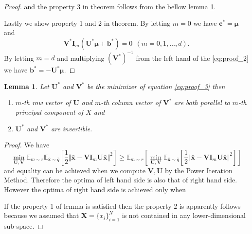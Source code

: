 \documentclass{article}
\newtheorem{lemma}{Lemma}
\begin{document}
\begin{proof}
      and the property 3 in theorem follows from the bellow lemma \ref{lm:pca}. 
      
      Lastly we show property 1 and 2 in theorem. By letting $m=0$ we have $\mathbf{c}^\ast = \mathbf{\mu}$ and 
      \begin{equation}
        \mathbf{V}^\ast \mathbf{I}_m (\mathbf{U^\ast} \mathbf{\mu} + \mathbf{b^\ast}) = 0 \ \ (m=0, 1, \dots, d).
      \end{equation}
      By letting $m=d$ and multiplying $(\mathbf{V}^\ast)^{-1}$ from the left hand of the \ref{eq:proof_2} we have $\mathbf{b}^\ast = - \mathbf{U}^\ast \mathbf{\mu}$.
    \end{proof}

    \begin{lemma}
      \label{lm:pca}
      Let $\mathbf{U}^\ast$ and $\mathbf{V}^\ast$ be the minimizer of equation \ref{eq:proof_3} then 
      \begin{enumerate}
        \item $m$-th row vector of $\mathbf{U}$ and $m$-th column vector of $\mathbf{V}^\ast$ are both parallel to $m$-th principal component of $X$ and
        \item $\mathbf{U}^\ast$ and $\mathbf{V}^\ast$ are invertible.
      \end{enumerate}
    \end{lemma}
    \begin{proof}
      We have
      \begin{equation}
        \min_{\mathbf{U}, \mathbf{V}} \mathbb{E}_{m \sim r} \mathbb{E}_{\bar{\mathbf{x}} \sim \bar{q}} \left[ \frac{1}{2} \Vert \bar{\mathbf{x}} - \mathbf{V} \mathbf{I}_m \mathbf{U} \bar{\mathbf{x}} \Vert^2 \right]  
        \geq \mathbb{E}_{m \sim r} \left[ \min_{\mathbf{U}, \mathbf{V}} \mathbb{E}_{\bar{\mathbf{x}} \sim \bar{q}} \left[ \frac{1}{2} \Vert \bar{\mathbf{x}} - \mathbf{V} \mathbf{I}_m \mathbf{U} \bar{\mathbf{x}} \Vert^2 \right] \right]
        \label{eq:proof_4}
      \end{equation}
      and equality can be achieved when we compute $\mathbf{V}, \mathbf{U}$ by the Power Iteration Method. Therefore the optima of left hand side is also that of right hand side. However the optima of right hand side is achieved only when
      
      If the property 1 of lemma is satisfied then the property 2 is apparently follows because we assumed that $\mathbf{X}=\{x_i\}_{i=1}^N$ is not contained in any lower-dimensional sub-space. 

      
    \end{proof}    
\end{document}
